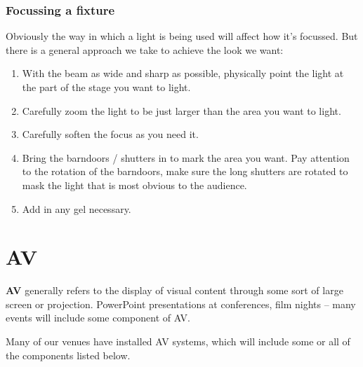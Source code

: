 \documentclass[14pt]{article} %
\begin{document}
\subsubsection{Focussing a fixture}

Obviously the way in which a light is being used will affect how it’s focussed. But there is a general approach we take to achieve the look we want:

\begin{enumerate}
\item	With the beam as wide and sharp as possible, physically point the light at the part of the stage you want to light.
\item	Carefully zoom the light to be just larger than the area you want to light.
\item	Carefully soften the focus as you need it.
\item	Bring the barndoors / shutters in to mark the area you want. Pay attention to the rotation of the barndoors, make sure the long shutters are rotated to mask the light that is most obvious to the audience.
\item	Add in any gel necessary.
\end{enumerate}


\section{AV}
\label{av}
\textbf{AV} generally refers to the display of visual content through some sort of large screen or projection. PowerPoint presentations at conferences, film nights -- many events will include some component of AV.

Many of our venues have installed AV systems, which will include some or all of the components listed below. 
\end{document}
